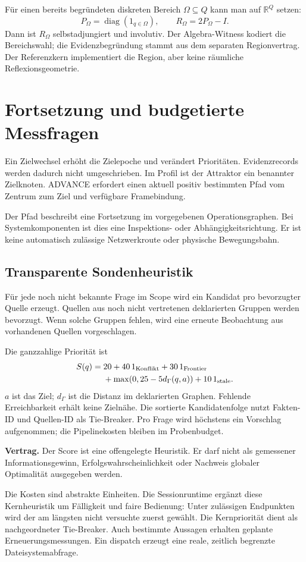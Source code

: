 \documentclass[11pt,a4paper]{article}
\newcommand{\R}{\mathbb R}
\newcommand{\contract}[1]{\vspace{3pt}\noindent\colorbox{pale}{\parbox{\dimexpr\linewidth-2\fboxsep}{\textbf{Vertrag.} #1}}\vspace{5pt}}
\newcommand{\nextsection}[2]{\clearpage{\color{accent}\small\textsf{#1}}\section{#2}}
\begin{document}
Für einen bereits begründeten diskreten Bereich $\Omega\subseteq Q$
kann man auf $\R^Q$ setzen:
\[
P_\Omega=\operatorname{diag}(1_{q\in\Omega}),\qquad
R_\Omega=2P_\Omega-I.
\]
Dann ist $R_\Omega$ selbstadjungiert und involutiv. Der
Algebra-Witness kodiert die Bereichswahl; die Evidenzbegründung
stammt aus dem separaten Regionvertrag. Der Referenzkern
implementiert die Region, aber keine räumliche Reflexionsgeometrie.

\nextsection{09 / ATTRAKTORNAVIGATION}{Fortsetzung und budgetierte Messfragen}
Ein Zielwechsel erhöht die Zielepoche und verändert Prioritäten.
Evidenzrecords werden dadurch nicht umgeschrieben. Im Profil ist der
Attraktor ein benannter Zielknoten. ADVANCE erfordert einen aktuell
positiv bestimmten Pfad vom Zentrum zum Ziel und verfügbare Framebindung.

Der Pfad beschreibt eine Fortsetzung im vorgegebenen Operationsgraphen.
Bei Systemkomponenten ist dies eine Inspektions- oder
Abhängigkeitsrichtung. Er ist keine automatisch zulässige
Netzwerkroute oder physische Bewegungsbahn.

\subsection{Transparente Sondenheuristik}
Für jede noch nicht bekannte Frage im Scope wird ein Kandidat pro
bevorzugter Quelle erzeugt. Quellen aus noch nicht vertretenen
deklarierten Gruppen werden bevorzugt. Wenn solche Gruppen fehlen,
wird eine erneute Beobachtung aus vorhandenen Quellen vorgeschlagen.

Die ganzzahlige Priorität ist
\begin{align*}
S(q)={}&20+40\,1_{\rm Konflikt}+30\,1_{\rm Frontier}\\
&+\max(0,25-5d_\Gamma(q,a))+10\,1_{\rm stale}.
\end{align*}
$a$ ist das Ziel; $d_\Gamma$ ist die Distanz im deklarierten Graphen.
Fehlende Erreichbarkeit erhält keine Zielnähe.
Die sortierte Kandidatenfolge nutzt Fakten-ID und Quellen-ID als
Tie-Breaker. Pro Frage wird höchstens ein Vorschlag aufgenommen;
die Pipelinekosten bleiben im Probenbudget.

\contract{Der Score ist eine offengelegte Heuristik. Er darf nicht
als gemessener Informationsgewinn, Erfolgswahrscheinlichkeit oder
Nachweis globaler Optimalität ausgegeben werden.}

Die Kosten sind abstrakte Einheiten. Die Sessionruntime ergänzt diese
Kernheuristik um Fälligkeit und faire Bedienung: Unter zulässigen
Endpunkten wird der am längsten nicht versuchte zuerst gewählt.
Die Kernpriorität dient als nachgeordneter Tie-Breaker.
Auch bestimmte Aussagen erhalten geplante Erneuerungsmessungen.
Ein dispatch erzeugt eine reale, zeitlich begrenzte Dateisystemabfrage.
\end{document}
